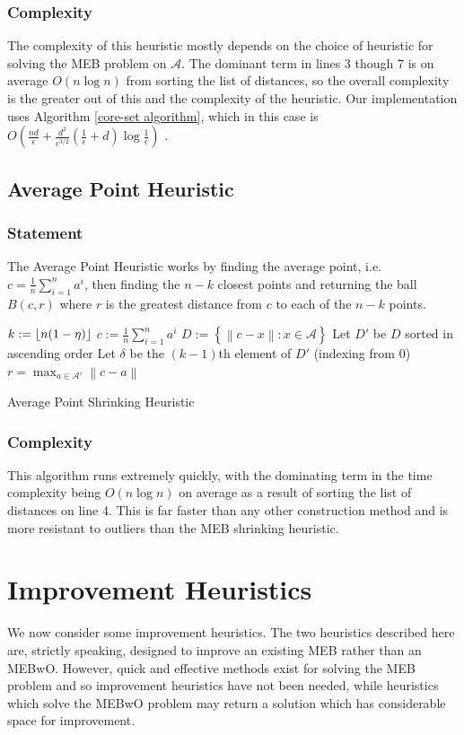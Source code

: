 \documentclass[11pt,twoside]{report}
\newcommand{\A}{\mathcal{A}} %
\newcommand{\norm}[1]{\left\lVert#1\right\rVert} %
\DeclarePairedDelimiter\floor{\lfloor}{\rfloor}
\theoremstyle{definition}
\numberwithin{theorem}{section}
\numberwithin{definition}{section}
\numberwithin{lemma}{section}
\numberwithin{proposition}{section}
\numberwithin{equation}{section}
\numberwithin{figure}{section}
\begin{document}
\subsubsection{Complexity}
The complexity of this heuristic mostly depends on the choice of heuristic for solving the MEB problem on $\A$. The dominant term in lines 3 though 7 is on average $O(n\log n)$ from sorting the list of distances, so the overall complexity is the greater out of this and the complexity of the heuristic. Our implementation uses Algorithm \ref{core-set algorithm}, which in this case is $O\left(\frac{nd}{\epsilon}+\frac{d^2}{\epsilon^{3/2}}\left(\frac{1}{\epsilon}+d\right)\log\frac{1}{\epsilon}\right)$ \cite[Page 6]{core-sets}.
\subsection{Average Point Heuristic}
\subsubsection{Statement}
The Average Point Heuristic works by finding the average point, i.e. $c=\frac{1}{n}\sum_{i=1}^n a^i$, then finding the $n-k$ closest points and returning the ball $B(c,r)$ where $r$ is the greatest distance from $c$ to each of the $n-k$ points.

\begin{algorithm}[H]\label{avg point shrink}
    \SetAlgoLined
    \KwIn{Data set $\A$, $\eta\in[0,1]$}
    $k:=\floor{n(1-\eta)}$\;
    $c:=\frac{1}{n}\sum_{i=1}^na^i$\;
    $D:=\left\{\norm{c-x}: x\in\A\right\}$\;
    Let $D'$ be $D$ sorted in ascending order\;
    Let $\delta$ be the $(k-1)$th element of $D'$ (indexing from 0)\;
    $r = \max_{a\in\A'}\norm{c-a}$\;
    
    \caption{Average Point Shrinking Heuristic}
\end{algorithm}

\subsubsection{Complexity}
This algorithm runs extremely quickly, with the dominating term in the time complexity being $O(n\log n)$ on average as a result of sorting the list of distances on line 4. This is far faster than any other construction method and is more resistant to outliers than the MEB shrinking heuristic.



\section{Improvement Heuristics}\label{sec:improvement_heuristics}
We now consider some improvement heuristics. The two heuristics described here are, strictly speaking, designed to improve an existing MEB rather than an MEBwO. However, quick and effective methods exist for solving the MEB problem and so improvement heuristics have not been needed, while heuristics which solve the MEBwO problem may return a solution which has considerable space for improvement.
\end{document}
